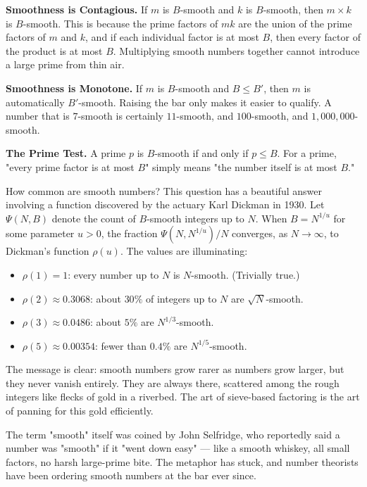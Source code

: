 \documentclass[11pt,twoside,openright]{book}
\theoremstyle{definition}
\theoremstyle{remark}
\begin{document}
\textbf{Smoothness is Contagious.} If $m$ is $B$-smooth and $k$ is $B$-smooth, then $m \times k$ is $B$-smooth. This is because the prime factors of $mk$ are the union of the prime factors of $m$ and $k$, and if each individual factor is at most $B$, then every factor of the product is at most $B$. Multiplying smooth numbers together cannot introduce a large prime from thin air.

\textbf{Smoothness is Monotone.} If $m$ is $B$-smooth and $B \leq B'$, then $m$ is automatically $B'$-smooth. Raising the bar only makes it easier to qualify. A number that is $7$-smooth is certainly $11$-smooth, and $100$-smooth, and $1{,}000{,}000$-smooth.

\textbf{The Prime Test.} A prime $p$ is $B$-smooth if and only if $p \leq B$. For a prime, "every prime factor is at most $B$" simply means "the number itself is at most $B$."


How common are smooth numbers? This question has a beautiful answer involving a function discovered by the actuary Karl Dickman in 1930. Let $\Psi(N, B)$ denote the count of $B$-smooth integers up to $N$. When $B = N^{1/u}$ for some parameter $u > 0$, the fraction $\Psi(N, N^{1/u}) / N$ converges, as $N \to \infty$, to Dickman's function $\rho(u)$. The values are illuminating:

\begin{itemize}
  \item $\rho(1) = 1$: every number up to $N$ is $N$-smooth. (Trivially true.)
  \item $\rho(2) \approx 0.3068$: about $30\%$ of integers up to $N$ are $\sqrt{N}$-smooth.
  \item $\rho(3) \approx 0.0486$: about $5\%$ are $N^{1/3}$-smooth.
  \item $\rho(5) \approx 0.00354$: fewer than $0.4\%$ are $N^{1/5}$-smooth.
\end{itemize}

The message is clear: smooth numbers grow rarer as numbers grow larger, but they never vanish entirely. They are always there, scattered among the rough integers like flecks of gold in a riverbed. The art of sieve-based factoring is the art of panning for this gold efficiently.

The term "smooth" itself was coined by John Selfridge, who reportedly said a number was "smooth" if it "went down easy" --- like a smooth whiskey, all small factors, no harsh large-prime bite. The metaphor has stuck, and number theorists have been ordering smooth numbers at the bar ever since.
\end{document}

